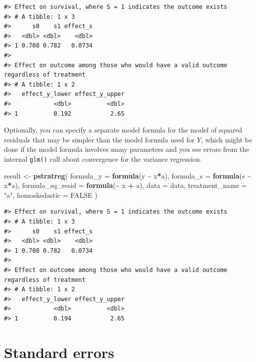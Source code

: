 \documentclass[
]{book}
\newenvironment{Shaded}{\begin{snugshade}}{\end{snugshade}}
\newcommand{\AttributeTok}[1]{\textcolor[rgb]{0.13,0.29,0.53}{#1}}
\newcommand{\ConstantTok}[1]{\textcolor[rgb]{0.56,0.35,0.01}{#1}}
\newcommand{\FunctionTok}[1]{\textcolor[rgb]{0.13,0.29,0.53}{\textbf{#1}}}
\newcommand{\NormalTok}[1]{#1}
\newcommand{\OtherTok}[1]{\textcolor[rgb]{0.56,0.35,0.01}{#1}}
\newcommand{\SpecialCharTok}[1]{\textcolor[rgb]{0.81,0.36,0.00}{\textbf{#1}}}
\newcommand{\StringTok}[1]{\textcolor[rgb]{0.31,0.60,0.02}{#1}}
\begin{document}
\begin{verbatim}
#> Effect on survival, where S = 1 indicates the outcome exists
#> # A tibble: 1 x 3
#>      s0    s1 effect_s
#>   <dbl> <dbl>    <dbl>
#> 1 0.708 0.782   0.0734
#> 
#> Effect on outcome among those who would have a valid outcome regardless of treatment
#> # A tibble: 1 x 2
#>   effect_y_lower effect_y_upper
#>            <dbl>          <dbl>
#> 1          0.192           2.65
\end{verbatim}

Optionally, you can specify a separate model formula for the model of squared residuals that may be simpler than the model formula used for \(Y\), which might be done if the model formula involves many parameters and you see errors from the internal \texttt{glm()} call about convergence for the variance regression.

\begin{Shaded}
\begin{Highlighting}[]
\NormalTok{result }\OtherTok{\textless{}{-}} \FunctionTok{pstratreg}\NormalTok{(}
  \AttributeTok{formula\_y =} \FunctionTok{formula}\NormalTok{(y }\SpecialCharTok{\textasciitilde{}}\NormalTok{ x}\SpecialCharTok{*}\NormalTok{a),}
  \AttributeTok{formula\_s =} \FunctionTok{formula}\NormalTok{(s }\SpecialCharTok{\textasciitilde{}}\NormalTok{ x}\SpecialCharTok{*}\NormalTok{a),}
  \AttributeTok{formula\_sq\_resid =} \FunctionTok{formula}\NormalTok{(}\SpecialCharTok{\textasciitilde{}}\NormalTok{ x }\SpecialCharTok{+}\NormalTok{ a),}
  \AttributeTok{data =}\NormalTok{ data,}
  \AttributeTok{treatment\_name =} \StringTok{"a"}\NormalTok{,}
  \AttributeTok{homoskedastic =} \ConstantTok{FALSE}
\NormalTok{)}
\end{Highlighting}
\end{Shaded}

\begin{verbatim}
#> Effect on survival, where S = 1 indicates the outcome exists
#> # A tibble: 1 x 3
#>      s0    s1 effect_s
#>   <dbl> <dbl>    <dbl>
#> 1 0.708 0.782   0.0734
#> 
#> Effect on outcome among those who would have a valid outcome regardless of treatment
#> # A tibble: 1 x 2
#>   effect_y_lower effect_y_upper
#>            <dbl>          <dbl>
#> 1          0.194           2.65
\end{verbatim}

\chapter{Standard errors}\label{standard-errors}
\end{document}
